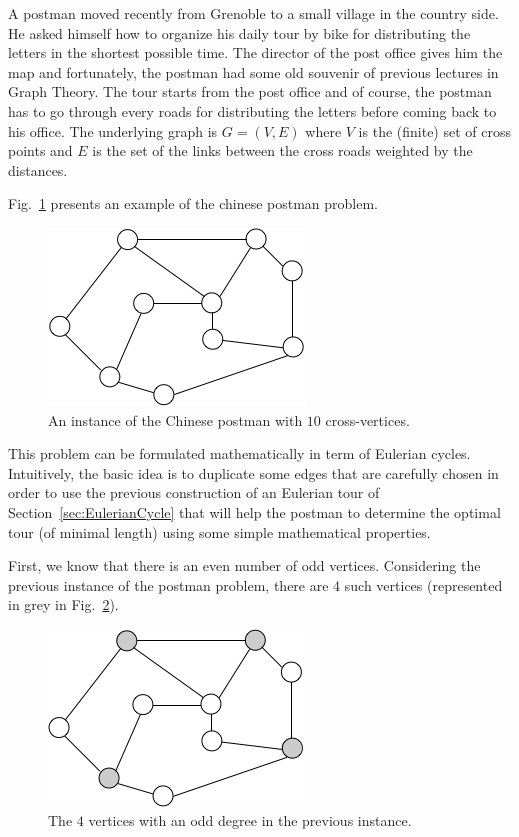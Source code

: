 {A postman moved recently from Grenoble to a small village in the country side. 
He asked himself how to organize his daily tour by bike for distributing the letters in the shortest possible time. 
The director of the post office gives him the map and 
fortunately, the postman had some old souvenir of previous lectures in Graph Theory.  
The tour starts from the post office and of course, the postman has to go through every roads for distributing the letters before coming back
to his office.
The underlying graph is $G=(V,E)$ where $V$ is the (finite) set of cross points and $E$ is the set of the links between the cross roads
weighted by the distances.  

Fig.~\ref{fig:EulerianInitial} presents an example of the chinese postman problem. 
\begin{figure}[hbt]
\begin{center}
       \includegraphics[scale=0.6]{FiguresGraph/EulerienInitial}
       \caption{An instance of the Chinese postman with $10$ cross-vertices.}
              \label{fig:EulerianInitial}
\end{center}
\end{figure}

\bigskip

This problem can be formulated mathematically in term of Eulerian
cycles.  Intuitively, the basic idea is to duplicate some edges that
are carefully chosen in order to use the previous construction of an
Eulerian tour of Section~\ref{sec:EulerianCycle} that will help the
postman to determine the optimal tour (of minimal length) using some
simple mathematical properties.
\bigskip

First, we know that there is an even number of odd vertices.
Considering the previous instance of the postman problem, there are $4$ such vertices (represented in grey in Fig.~\ref{fig:EulerianVodd}).

\begin{figure}[hbt]
\begin{center}
       \includegraphics[scale=0.6]{FiguresGraph/EulerienVodd}
       \caption{The $4$ vertices with an odd degree in the previous instance.}
              \label{fig:EulerianVodd}
\end{center}
\end{figure}
\bigskip

}
